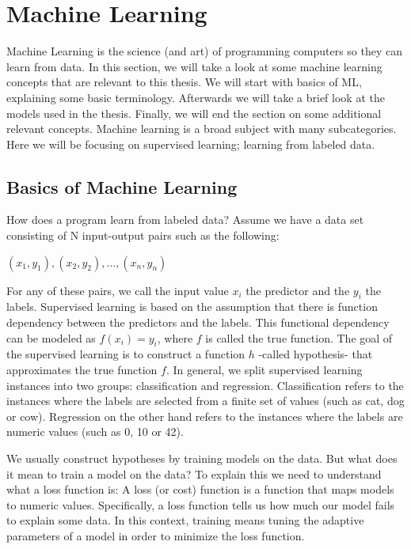 \section{Machine Learning}
Machine Learning is the science (and art) of programming computers so they can learn from data. \parencite{ml:homl}
In this section, we will take a look at some machine learning concepts that are relevant to this thesis.
We will start with basics of ML, explaining some basic terminology. 
Afterwards we will take a brief look at the models used in the thesis.
Finally, we will end the section on some additional relevant concepts.
Machine learning is a broad subject with many subcategories.
Here we will be focusing on supervised learning; learning from labeled data.

\subsection{Basics of Machine Learning}
How does a program learn from labeled data?
Assume we have a data set consisting of N input-output pairs such as the following:
 
$(x_1,y_1), (x_2,y_2), \ldots, (x_n,y_n)$

For any of these pairs, we call the input value $x_i$ the predictor and the $y_i$ the labels.\parencite{ml:homl}
Supervised learning is based on the assumption that there is function dependency between the predictors and the labels.
This functional dependency can be modeled as $f(x_i)=y_i$, where $f$ is called the true function.
The goal of the supervised learning is to construct a function $h$ -called hypothesis- that approximates the true function $f$.
In general, we split supervised learning instances into two groups: classification and regression. 
Classification refers to the instances where the labels are selected from a finite set of values (such as cat, dog or cow).
Regression on the other hand refers to the instances where the labels are numeric values (such as 0, 10 or 42). \parencite{ai:ml}

We usually construct hypotheses by training models on the data.
But what does it mean to train a model on the data?
To explain this we need to understand what a loss function is:
A loss (or cost) function is a function that maps models to numeric values.
Specifically, a loss function tells us how much our model fails to explain some data.
In this context, training means tuning the adaptive parameters of a model in order to minimize the loss function. \parencite{ml:prml}

